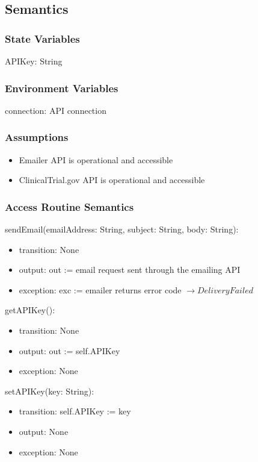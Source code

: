 \documentclass[12pt, titlepage]{article}
\begin{document}
\subsection{Semantics}

\subsubsection{State Variables}
APIKey: String

\subsubsection{Environment Variables}
connection: API connection

\subsubsection{Assumptions}
\begin{itemize}
  \item Emailer API is operational and accessible
  \item ClinicalTrial.gov API is operational and accessible
\end{itemize}

\subsubsection{Access Routine Semantics}

\noindent sendEmail(emailAddress: String, subject: String, body: String):
\begin{itemize}
\item transition: None
\item output: out := email request sent through the emailing API
\item exception: exc := emailer returns error code $\rightarrow DeliveryFailed$
\end{itemize}

\noindent getAPIKey():
\begin{itemize}
\item transition: None
\item output: out := self.APIKey
\item exception: None
\end{itemize}

\noindent setAPIKey(key: String):
\begin{itemize}
\item transition: self.APIKey := key
\item output: None
\item exception: None
\end{itemize}
\end{document}
